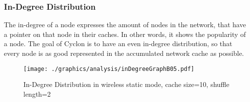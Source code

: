 \subsubsection{In-Degree Distribution}
\label{subsubsec:inDegree}
The in-degree of a node expresses the amount of nodes in the network, that
have a pointer on that node in their caches. In other words, it shows the
popularity of a node. The goal of Cyclon is to have an even in-degree distribution, so that
every node is as good represented in the accumulated network cache as
possible.

\begin{figure}
	\texttt{[image: ./graphics/analysis/inDegreeGraphB05.pdf]}
	\caption{In-Degree Distribution in wireless static mode, cache size=10, shuffle
	length=2}
	\label{fig:inDegreeDistB05}
\end{figure}

